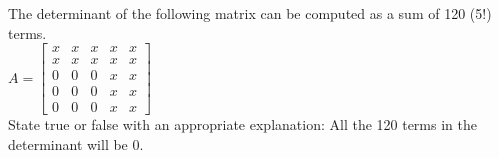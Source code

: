 \documentclass[solution,addpoints,12pt]{exam}
\begin{document}
\begin{questions}

\question[2] The determinant of the following matrix can be computed as a sum of 120 (5!) terms.\\
$A=\begin{bmatrix}
x&x&x&x&x\\
x&x&x&x&x\\
0&0&0&x&x\\
0&0&0&x&x\\
0&0&0&x&x
\end{bmatrix}$\\

State true or false with an appropriate explanation: All the 120 terms in the determinant will be 0.
\begin{solution}

\end{solution}

\end{questions}
\end{document}
